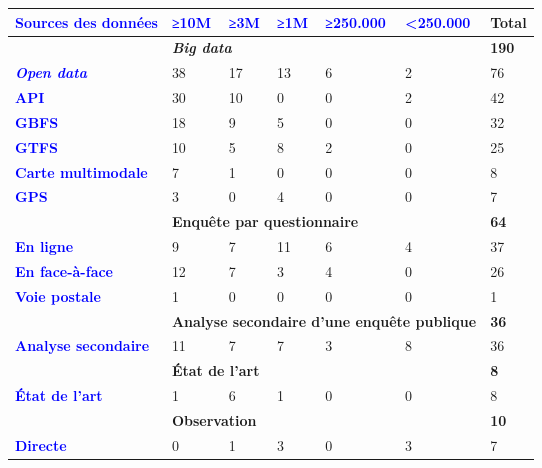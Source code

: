         \begin{table}[h]
        \centering
        \renewcommand{\arraystretch}{1.5}
        \begin{tabular}{p{3.9cm}p{1.3cm}p{1.3cm}p{1.3cm}p{1.3cm}p{1.3cm}p{1.2cm}}
        \hline
    \rule{0pt}{15pt} \textcolor{blue}{\textbf{Sources des données}} & \textcolor{blue}{\textbf{≥10M}} & \textcolor{blue}{\textbf{≥3M}} & \textcolor{blue}{\textbf{≥1M}} & \textcolor{blue}{\textbf{≥250.000}} & \textcolor{blue}{\textbf{<250.000}} & \textbf{Total}
    \\
            \hline
        & \multicolumn{5}{l}{\textbf{\textsl{Big data}}} & \textbf{190}\\
        \textcolor{blue}{\textbf{\textsl{Open data}}} & 38 & 17 & 13 & 6 & 2 & 76\\
        \textcolor{blue}{\textbf{API}} & 30 & 10 & 0 & 0 & 2 & 42\\
        \textcolor{blue}{\textbf{GBFS}} & 18 & 9 & 5 & 0 & 0 & 32\\
        \textcolor{blue}{\textbf{GTFS}} & 10 & 5 & 8 & 2 & 0 & 25\\
        \textcolor{blue}{\textbf{Carte multimodale}} & 7 & 1 & 0 & 0 & 0 & 8\\
        \textcolor{blue}{\textbf{GPS}} & 3 & 0 & 4 & 0 & 0 & 7\\
            \hline
        & \multicolumn{5}{l}{\textbf{Enquête par questionnaire}} & \textbf{64}\\
        \textcolor{blue}{\textbf{En ligne}} & 9 & 7 & 11 & 6 & 4 & 37\\
        \textcolor{blue}{\textbf{En face-à-face}} & 12 & 7 & 3 & 4 & 0 & 26\\
        \textcolor{blue}{\textbf{Voie postale}} & 1 & 0 & 0 & 0 & 0 & 1\\
            \hline
        & \multicolumn{5}{l}{\textbf{Analyse secondaire d'une enquête publique}} & \textbf{36}\\
        \textcolor{blue}{\textbf{Analyse secondaire}} & 11 & 7 & 7 & 3 & 8 & 36\\
            \hline
        & \multicolumn{5}{l}{\textbf{État de l'art}} & \textbf{8}\\
        \textcolor{blue}{\textbf{État de l'art}} & 1 & 6 & 1 & 0 & 0 & 8\\
            \hline
        & \multicolumn{5}{l}{\textbf{Observation}} & \textbf{10}\\
        \textcolor{blue}{\textbf{Directe}} & 0 & 1 & 3 & 0 & 3 & 7\\

\end{tabular}
\end{table}
